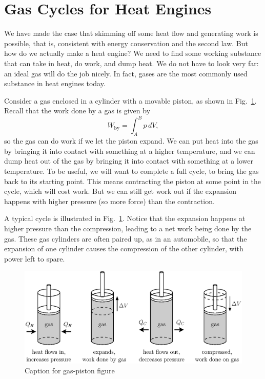 \section{Gas Cycles for Heat Engines}

We have made the case that skimming off some heat flow and generating
work is possible, that is, consistent with energy conservation and the
second law.  But how do we actually make a heat engine?  We need to
find some working substance that can take in heat, do work, and dump
heat.  We do not have to look very far: an ideal gas will do the job
nicely.  In fact, gases are the most commonly used substance in heat
engines today.

Consider a gas enclosed in a cylinder with a movable piston, as shown
in Fig.~\ref{fig:gas_piston}.  Recall that the work done by a gas is
given by
\begin{equation}
W_\text{by} = \int_A^B p\,dV,
\end{equation}  
so the gas can do work if we let the piston expand.  We can put heat
into the gas by bringing it into contact with something at a higher
temperature, and we can dump heat out of the gas by bringing it into
contact with something at a lower temperature.  To be useful, we will
want to complete a full cycle, to bring the gas back to its starting
point.  This means contracting the piston at some point in the cycle,
which will cost work.  But we can still get work out if the expansion
happens with higher pressure (so more force) than the contraction.

A typical cycle is illustrated in Fig.~\ref{fig:gas_piston}. Notice
that the expansion happens at higher pressure than the compression,
leading to a net work being done by the gas.  These gas cylinders are
often paired up, as in an automobile, so that the expansion of one
cylinder causes the compression of the other cylinder, with power left
to spare.

\begin{figure}
\begin{center}
\includegraphics[width=5.5in]{heat_engines/gas_piston.eps}
\caption{Caption for gas-piston figure}
\label{fig:gas_piston}
\end{center}
\end{figure}


